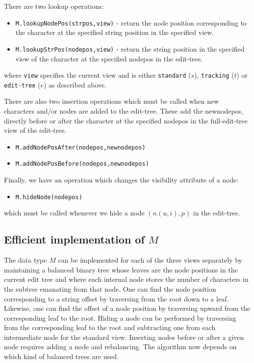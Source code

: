\documentclass{amsart}
\begin{document}
There are two lookup operations:
\begin{itemize}
\item {\tt M.lookupNodePos(strpos,view)} - return the node position corresponding
to the character at the specified string position in the specified view.

\item {\tt M.lookupStrPos(nodepos,view)} - return the string position in the
specified view of the character at the specified nodepos in the edit-tree.
\end{itemize}
where {\tt view} specifies the current view and is either {\tt standard} ($s$),
{\tt tracking} ($t$) or {\tt edit-tree} ($e$) as described above.

There are also two insertion operations which must be called when
new characters and/or nodes are added to the edit-tree. 
These add the newnodepos, directly before or after the character at the specified nodepos in the full-edit-tree view of the edit-tree.
\begin{itemize}

\item {\tt M.addNodePosAfter(nodepos,newnodepos)}

\item {\tt M.addNodePosBefore(nodepos,newnodepos)}

\end{itemize}


Finally, we have an operation which changes the visibility attribute of a node:
\begin{itemize}

\item {\tt M.hideNode(nodepos)}

\end{itemize}
which must be called whenever we hide a node $(n(u,i),p)$ in the edit-tree.


\subsection{Efficient implementation of $M$}
The data type $M$ can be implemented for each of the three views separately
by maintaining a balanced binary tree whose leaves are the node positions
in the current edit tree and where each internal node stores the number
of characters in the subtree emanating from that node. One can find the
node position corresponding to a string offset by traversing from the root
down to a leaf. Likewise, one can find the offset of a node position by traversing
upward from the corresponding leaf to the root. Hiding a node can be performed
by traversing from the corresponding leaf to the root and subtracting one
from each intermediate node for the standard view. Inserting nodes before
or after a given node requires adding a node and rebalancing. The algorithm
now depends on which kind of balanced trees are used.
\end{document}
